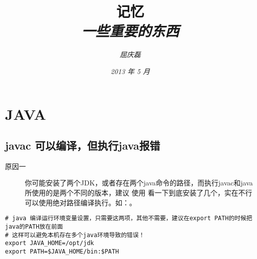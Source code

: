 \documentclass{article}
\begin{document}
\title{%
  {\huge \textsf{记忆}\\\smallskip}%
  {\small \textit{一些重要的东西}}
}

\author{\textit{屈庆磊}\\[2mm]
       }

\date{\textit{2013 年 5 月}}

\maketitle
\newpage
\begin{multicols}{2}
\tableofcontents
\end{multicols}
\newpage 

\section{JAVA}
\subsection{javac 可以编译，但执行java报错}
\begin{description}
\item[原因一] 你可能安装了两个JDK，或者存在两个java命令的路径，而执行javac和java所使用的是两个不同的版本，建议
使用 看一下到底安装了几个，实在不行可以使用绝对路径编译执行。如：。
\end{description}

\begin{verbatim}
# java 编译运行环境变量设置，只需要这两项，其他不需要，建议在export PATH的时候把 java的PATH放在前面
# 这样可以避免本机存在多个java环境导致的错误！
export JAVA_HOME=/opt/jdk
export PATH=$JAVA_HOME/bin:$PATH
\end{verbatim}
\end{document}
